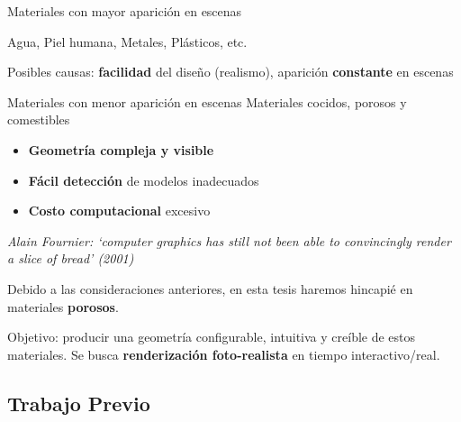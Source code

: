 \documentclass[spanish,unknownkeysallowed]{beamer}
\begin{document}
\begin{frame}{}

\begin{block}{Materiales con mayor aparición en escenas}

Agua, Piel humana, Metales, Plásticos, etc. 

Posibles causas: \textbf{facilidad} del diseño (realismo), aparición \textbf{constante} en escenas

\end{block}

\begin{block}{Materiales con menor aparición en escenas}
Materiales cocidos, porosos y comestibles


\begin{itemize}
\item \textbf{Geometría compleja y visible}
\item \textbf{Fácil detección} de modelos inadecuados
\item \textbf{Costo computacional} excesivo
\end{itemize}
\end{block}

{\it Alain Fournier: `computer graphics has still not been
able to convincingly render a slice of bread' (2001)}


\end{frame}

\begin{frame}
\begin{block}{}
Debido a las consideraciones anteriores, en esta tesis haremos hincapié en materiales \textbf{porosos}.

Objetivo: producir una geometría configurable, intuitiva y creíble de estos materiales. Se busca \textbf{renderización foto-realista} en tiempo interactivo/real.



\end{block}
\end{frame}


\subsection{Trabajo Previo}
\end{document}
